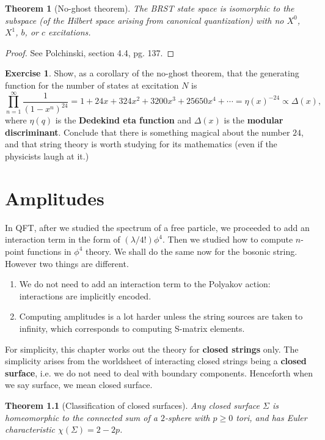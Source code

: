 \documentclass{report}
\theoremstyle{plain}
\newtheorem{theorem}{Theorem}[section]
\theoremstyle{definition}
\newtheorem{exercise}{Exercise}[section]
\theoremstyle{remark}
\begin{document}
\begin{theorem}[No-ghost theorem]
  The BRST state space is isomorphic to the subspace (of the Hilbert
  space arising from canonical quantization) with no $X^0$, $X^1$,
  $b$, or $c$ excitations.
\end{theorem}

\begin{proof}
  See Polchinski, section 4.4, pg. 137.
\end{proof}

\begin{exercise}
  Show, as a corollary of the no-ghost theorem, that the generating
  function for the number of states at excitation $N$ is
  \[ \prod_{n=1}^\infty \frac{1}{(1 - x^n)^{24}} = 1 + 24x + 324x^2 + 3200x^3 + 25650x^4 + \cdots = \eta(x)^{-24} \propto \Delta(x), \]
  where $\eta(q)$ is the {\bf Dedekind eta function} and $\Delta(x)$
  is the {\bf modular discriminant}. Conclude that there is something
  magical about the number $24$, and that string theory is worth
  studying for its mathematics (even if the physicists laugh at it.)
\end{exercise}

\chapter{Amplitudes}

In QFT, after we studied the spectrum of a free particle, we proceeded
to add an interaction term in the form of $(\lambda/4!)\phi^4$. Then
we studied how to compute $n$-point functions in $\phi^4$ theory. We
shall do the same now for the bosonic string. However two things are
different.
\begin{enumerate}
\item We do not need to add an interaction term to the Polyakov
  action: interactions are implicitly encoded.
\item Computing amplitudes is a lot harder unless the string sources
  are taken to infinity, which corresponds to computing S-matrix
  elements.
\end{enumerate}
For simplicity, this chapter works out the theory for {\bf closed
  strings} only. The simplicity arises from the worldsheet of
interacting closed strings being a {\bf closed surface}, i.e. we do
not need to deal with boundary components. Henceforth when we say
surface, we mean closed surface.

\begin{theorem}[Classification of closed surfaces]
  Any closed surface $\Sigma$ is homeomorphic to the connected sum of
  a $2$-sphere with $p \ge 0$ tori, and has Euler characteristic
  $\chi(\Sigma) = 2 - 2p$.
\end{theorem}
\end{document}
